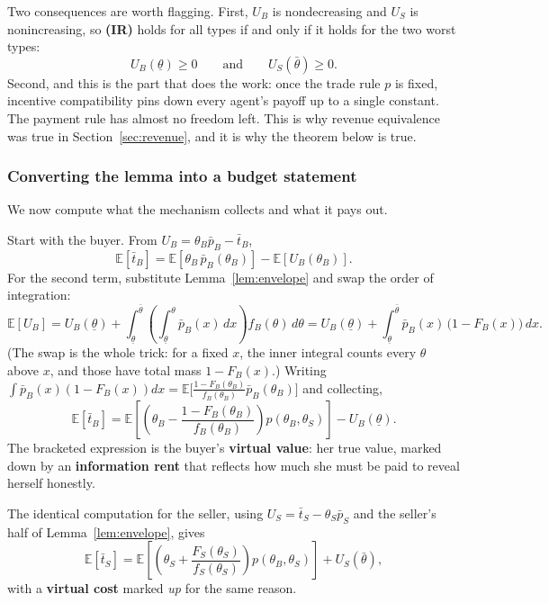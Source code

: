 \documentclass[12pt]{article}
\newcommand{\bbE}{\mathbb{E}}
\theoremstyle{definition}
\theoremstyle{remark}
\theoremstyle{plain}                          %
\newcommand{\lo}{\underline{\theta}}
\newcommand{\hi}{\bar{\theta}}
\begin{document}
\noindent Two consequences are worth flagging. First, $U_B$ is nondecreasing and $U_S$ is nonincreasing, so \textbf{(IR)} holds for all types if and only if it holds for the two worst types:
\begin{equation}\label{eq:ms-ir}
    U_B(\lo) \ge 0 \qquad \text{and} \qquad U_S(\hi) \ge 0.
\end{equation}
Second, and this is the part that does the work: once the trade rule $p$ is fixed, incentive compatibility pins down every agent's payoff up to a single constant. The payment rule has almost no freedom left. This is why revenue equivalence was true in Section~\ref{sec:revenue}, and it is why the theorem below is true.
 
\subsubsection{Converting the lemma into a budget statement}
 
We now compute what the mechanism collects and what it pays out.
 
Start with the buyer. From $U_B = \theta_B\bar p_B - \bar t_B$,
\[
    \bbE[\bar t_B] = \bbE[\theta_B\,\bar p_B(\theta_B)] - \bbE[U_B(\theta_B)].
\]
For the second term, substitute Lemma~\ref{lem:envelope} and swap the order of integration:
\[
    \bbE[U_B] = U_B(\lo) + \int_{\lo}^{\hi}\!\!\left(\int_{\lo}^{\theta}\bar p_B(x)\,dx\right)\!f_B(\theta)\,d\theta
    = U_B(\lo) + \int_{\lo}^{\hi} \bar p_B(x)\,\big(1 - F_B(x)\big)\,dx.
\]
(The swap is the whole trick: for a fixed $x$, the inner integral counts every $\theta$ above $x$, and those have total mass $1 - F_B(x)$.) Writing $\int \bar p_B(x)(1-F_B(x))dx = \bbE\big[\tfrac{1-F_B(\theta_B)}{f_B(\theta_B)}\bar p_B(\theta_B)\big]$ and collecting,
\begin{equation}\label{eq:ms-tb}
    \bbE[\bar t_B] = \bbE\!\left[\left(\theta_B - \frac{1-F_B(\theta_B)}{f_B(\theta_B)}\right) p(\theta_B,\theta_S)\right] - U_B(\lo).
\end{equation}
The bracketed expression is the buyer's \textbf{virtual value}: her true value, marked down by an \textbf{information rent} that reflects how much she must be paid to reveal herself honestly.
 
The identical computation for the seller, using $U_S = \bar t_S - \theta_S\bar p_S$ and the seller's half of Lemma~\ref{lem:envelope}, gives
\begin{equation}\label{eq:ms-ts}
    \bbE[\bar t_S] = \bbE\!\left[\left(\theta_S + \frac{F_S(\theta_S)}{f_S(\theta_S)}\right) p(\theta_B,\theta_S)\right] + U_S(\hi),
\end{equation}
with a \textbf{virtual cost} marked \emph{up} for the same reason.
 
\end{document}
